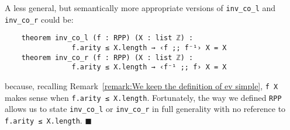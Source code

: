 \documentclass[runningheads]{llncs}
\newcommand*{\qeda}{\hfill\ensuremath{\blacksquare}}%
\begin{document}
\begin{remark}
\label{remark:On our simplifying choices on ev}
A less general, but semantically more appropriate versions of  \lstinline|inv_co_l| and \lstinline|inv_co_r| could be:
\begin{lstlisting}
    theorem inv_co_l (f : RPP) (X : list ℤ) :
                f.arity ≤ X.length → ‹f ;; f⁻¹› X = X
    theorem inv_co_r (f : RPP) (X : list ℤ) :
                f.arity ≤ X.length → ‹f⁻¹ ;; f› X = X
\end{lstlisting}
because, recalling Remark~\ref{remark:We keep the definition of ev simple}, \lstinline|f X| makes sense when \lstinline{f.arity ≤ X.length}.
Fortunately, the way we defined \lstinline{RPP} allows us to state \lstinline|inv_co_l| or \lstinline|inv_co_r| in full generality
with no reference to \lstinline|f.arity ≤ X.length|.
\qeda
\end{remark}

\end{document}
